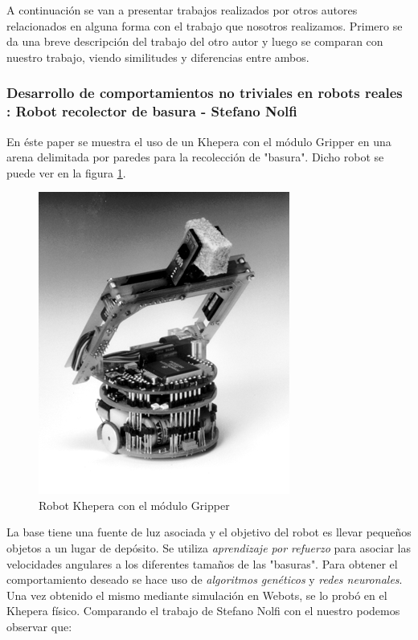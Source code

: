 A continuaci\'on se van a presentar trabajos realizados por otros autores
relacionados en alguna forma con el trabajo que nosotros realizamos. Primero se
da una breve descripci\'on del trabajo del otro autor y luego se comparan con
nuestro trabajo, viendo similitudes y diferencias entre ambos.

\subsubsection{Desarrollo de comportamientos no triviales en robots reales : 
Robot recolector de basura - Stefano Nolfi \cite{nolfi:evolving}}
En \'este paper se muestra el uso de un Khepera con el m\'odulo Gripper en una
arena delimitada por paredes para la recolecci\'on de "basura". Dicho robot se
puede ver en la figura \ref{fig:khepera}.
\begin{figure}[htp]
\begin{center}
\includegraphics[scale=0.6]{comportamientos/gripperAH.png}
\caption{Robot Khepera con el m\'odulo Gripper}
\label{fig:khepera}
\end{center}
\end{figure}
La base tiene una fuente de luz asociada y el objetivo del robot es llevar
peque\~nos objetos a un lugar de dep\'osito. Se utiliza \emph{aprendizaje por
refuerzo} para asociar las velocidades angulares a los diferentes tama\~nos de
las "basuras". Para obtener el comportamiento deseado se hace uso de
\emph{algoritmos gen\'eticos} y \emph{redes neuronales}. Una vez obtenido el
mismo mediante simulaci\'on en Webots, se lo prob\'o en el Khepera f\'isico.
Comparando el trabajo de Stefano Nolfi con el nuestro podemos observar que:
